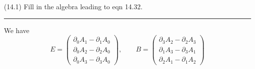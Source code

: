 \documentclass[12pt]{article}
\begin{document}
(14.1)
Fill in the algebra leading to eqn 14.32.

\bigskip
\hrule

\bigskip
We have
\begin{equation*}
E=\begin{pmatrix}
\partial_0A_1-\partial_1A_0
\\
\partial_0A_2-\partial_2A_0
\\
\partial_0A_3-\partial_3A_0
\end{pmatrix},
\qquad
B=\begin{pmatrix}
\partial_3A_2-\partial_2A_3
\\
\partial_1A_3-\partial_3A_1
\\
\partial_2A_1-\partial_1A_2
\end{pmatrix}
\end{equation*}
\end{document}

